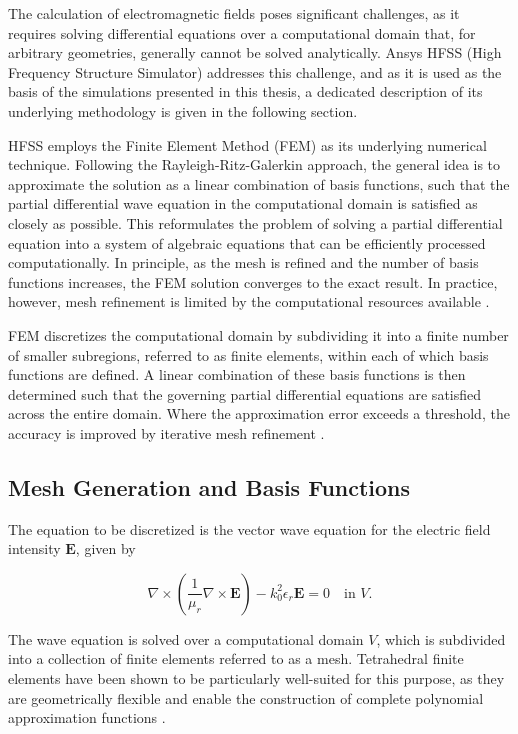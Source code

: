 
The calculation of electromagnetic fields poses significant challenges, as it requires solving differential equations over a computational domain that, for arbitrary geometries, generally cannot be solved analytically. Ansys HFSS (High Frequency Structure Simulator) addresses this challenge, and as it is used as the basis of the simulations presented in this thesis, a dedicated description of its underlying methodology is given in the following section.

HFSS employs the Finite Element Method (FEM) as its underlying numerical technique. Following the Rayleigh-Ritz-Galerkin approach, the general idea is to approximate the solution as a linear combination of basis functions, such that the partial differential wave equation in the computational domain is satisfied as closely as possible. This reformulates the problem of solving a partial differential equation into a system of algebraic equations that can be efficiently processed computationally. In principle, as the mesh is refined and the number of basis functions increases, the FEM solution converges to the exact result. In practice, however, mesh refinement is limited by the computational resources available \cite[pp.~1--2]{STRANG_2018}.

FEM discretizes the computational domain by subdividing it into a finite number of smaller subregions, referred to as finite elements, within each of which basis functions are defined. A linear combination of these basis functions is then determined such that the governing partial differential equations are satisfied across the entire domain. Where the approximation error exceeds a threshold, the accuracy is improved by iterative mesh refinement \cite{kopp_hfss}.

\subsection{Mesh Generation and Basis Functions}

The equation to be discretized is the vector wave equation 
for the electric field intensity $\mathbf{E}$, given by \cite{Cendes_Lee_1988,85399,Cendes_1991}

\begin{equation}
	\nabla\times\left(\frac{1}{\mu_r}\nabla\times\mathbf{E}\right)-k_0^2\epsilon_r\mathbf{E}=0 \quad\text{in $V$}.
	\label{eqn:full_wave_equation}
\end{equation}

The wave equation is solved over a computational domain $V$, which is subdivided into a collection of finite elements referred to as a mesh. Tetrahedral finite elements have been shown to be particularly well-suited for this purpose, as they are geometrically flexible and enable the construction of complete polynomial approximation functions \cite{Shenton_Cendes_1985}.

